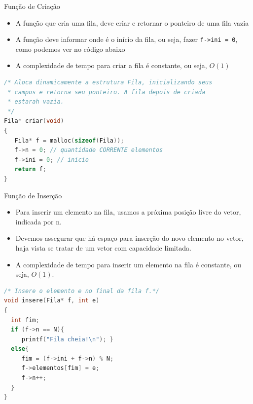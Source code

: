 \begin{frame}[fragile]{Função de Criação}
	\begin{itemize}
		\item A função que cria uma fila, deve criar e retornar o ponteiro de uma fila vazia

		\item A função deve informar onde é o início da fila, ou seja, fazer \texttt{f->ini = 0}, 
		como podemos ver no código abaixo
		
		\item A complexidade de tempo para criar a fila é constante, 
		ou seja, $O(1)$
	\end{itemize}
\small	
\begin{lstlisting}[language=C]
/* Aloca dinamicamente a estrutura Fila, inicializando seus
 * campos e retorna seu ponteiro. A fila depois de criada
 * estarah vazia.
 */
Fila* criar(void)
{
   Fila* f = malloc(sizeof(Fila));
   f->n = 0; // quantidade CORRENTE elementos
   f->ini = 0; // inicio
   return f;
}
\end{lstlisting}
\end{frame}

\begin{frame}[fragile]{Função de Inserção}  
	\begin{itemize}
		\item Para inserir um elemento na fila, usamos a próxima posição 
		livre do vetor, indicada por \alert{n}.
		\item Devemos assegurar que há espaço para inserção do novo 
		elemento no vetor, haja vista se tratar de um vetor com capacidade limitada. 
		\item A complexidade de tempo para inserir um elemento na fila 
		é constante, ou seja, $O(1)$.
	\end{itemize}
\footnotesize
\begin{lstlisting}[language=C]
/* Insere o elemento e no final da fila f.*/
void insere(Fila* f, int e)
{
  int fim;
  if (f->n == N){
     printf("Fila cheia!\n"); }
  else{
     fim = (f->ini + f->n) % N;
     f->elementos[fim] = e;  
     f->n++;
  }
}
\end{lstlisting}	
\end{frame}

